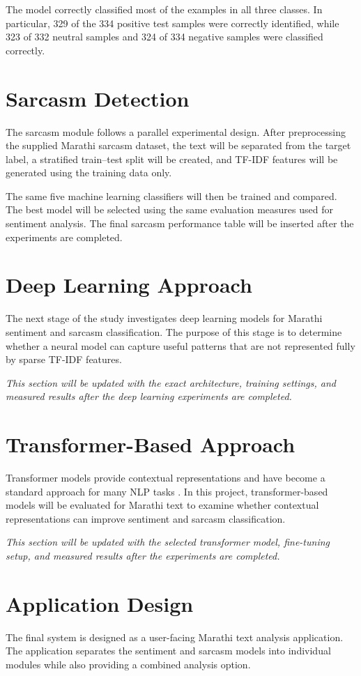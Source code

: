 \documentclass[11pt]{article}
\begin{document}
The model correctly classified most of the examples in all three classes. In particular, 329 of the 334 positive test samples were correctly identified, while 323 of 332 neutral samples and 324 of 334 negative samples were classified correctly.

\section{Sarcasm Detection}
The sarcasm module follows a parallel experimental design. After preprocessing the supplied Marathi sarcasm dataset, the text will be separated from the target label, a stratified train--test split will be created, and TF-IDF features will be generated using the training data only.

The same five machine learning classifiers will then be trained and compared. The best model will be selected using the same evaluation measures used for sentiment analysis. The final sarcasm performance table will be inserted after the experiments are completed.

\section{Deep Learning Approach}
The next stage of the study investigates deep learning models for Marathi sentiment and sarcasm classification. The purpose of this stage is to determine whether a neural model can capture useful patterns that are not represented fully by sparse TF-IDF features.

\textit{This section will be updated with the exact architecture, training settings, and measured results after the deep learning experiments are completed.}

\section{Transformer-Based Approach}
Transformer models provide contextual representations and have become a standard approach for many NLP tasks \citep{vaswani2017,devlin2019}. In this project, transformer-based models will be evaluated for Marathi text to examine whether contextual representations can improve sentiment and sarcasm classification.

\textit{This section will be updated with the selected transformer model, fine-tuning setup, and measured results after the experiments are completed.}

\section{Application Design}
The final system is designed as a user-facing Marathi text analysis application. The application separates the sentiment and sarcasm models into individual modules while also providing a combined analysis option.
\end{document}
